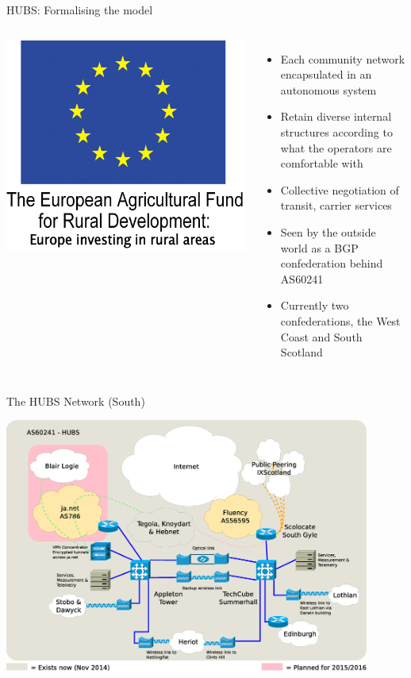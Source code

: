 \documentclass{beamer}
\begin{document}
\begin{frame}{HUBS: Formalising the model}
\begin{columns}
\begin{center}
      \hspace{1pt}
      \includegraphics[height=0.07\textheight]{eu-and-words.jpg}
    \end{center}
    \begin{itemize}
      \item Each community network encapsulated in an autonomous
        system
      \item Retain diverse internal structures according to what the
        operators are comfortable with
      \item Collective negotiation of transit, carrier services
      \item Seen by the outside world as a BGP confederation behind
        AS60241
      \item Currently two confederations, the West Coast and
        South Scotland
    \end{itemize}
  \end{columns}
\end{frame}
\begin{frame}{The HUBS Network (South)}
  \begin{center}
    \includegraphics[width=0.9\textwidth]{hubs-nov2014.eps}
  \end{center}
\end{frame}
\end{document}
